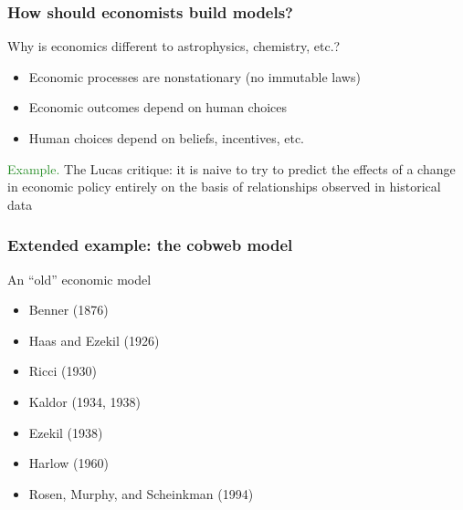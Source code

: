 \documentclass[
    xcolor={svgnames,dvipsnames},
    hyperref={colorlinks, citecolor=DeepPink4, linkcolor=DarkRed, urlcolor=DarkBlue}
    ]{beamer}  %
\newcommand{\Eg}{\textcolor{ForestGreen}{Example. }}
\newcommand{\1}{\mathbbm 1}
\begin{document}
\begin{frame}
    \frametitle{How should economists build models?}

    Why is economics different to astrophysics, chemistry, etc.?

    \begin{itemize}
        \item Economic processes are nonstationary (no immutable laws)
            \vspace{0.3em}
        \item Economic outcomes depend on human choices
            \vspace{0.3em}
        \item Human choices depend on beliefs, incentives, etc.
    \end{itemize}

            \vspace{0.3em}
            \vspace{0.3em}
            \vspace{0.3em}

    \Eg The Lucas critique: it is naive to try to predict the effects
        of a change in economic policy entirely on the basis of relationships
        observed in historical data

\end{frame}

\begin{frame}
    \frametitle{Extended example: the cobweb model}

    An ``old'' economic model

    \begin{itemize}
        \item Benner (1876)
        \item Haas and Ezekil (1926)
        \item Ricci (1930)
        \item Kaldor (1934, 1938)
        \item Ezekil (1938)
        \item Harlow (1960)
        \item Rosen, Murphy, and Scheinkman (1994)
    \end{itemize}

\end{frame}
\end{document}
